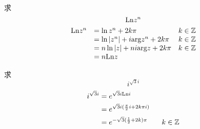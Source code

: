 \begin{homeworkProblem}
    求\[\mathrm{Ln} z^n\]
\solution
\[\begin{array} {lll}
\mathrm{Ln} z^n &= \ln z^n + 2k\pi & k\in\mathbb{Z}\\
&= \ln|z^n| + i\mathrm{arg} z^n + 2k\pi & k\in\mathbb{Z} \\
&= n\ln|z| + ni\mathrm{arg} z + 2k\pi & k\in\mathbb{Z} \\
&= n\mathrm{Ln} z
\end{array}\]
\end{homeworkProblem}

\begin{homeworkProblem}
求
\[i^{\sqrt3i}\]
\solution
\[\begin{split}
i^{\sqrt3i} &=
e^{\sqrt3i\mathrm{Ln} i}\\
&= e^{\sqrt3i(\frac{\pi}{2}i + 2k\pi i)} \\
&= e^{-\sqrt3(\frac{1}{2}+2k)\pi}\qquad k\in\mathbb{Z}
\end{split}\]
\end{homeworkProblem}
\newpage
